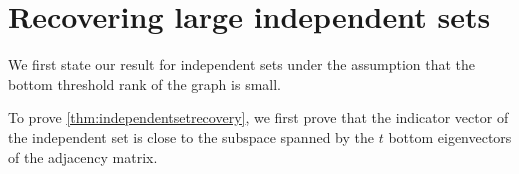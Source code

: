 \section{Recovering large independent sets}

We first state our result for independent sets under the assumption that the bottom threshold rank of the graph is small.




To prove \cref{thm:independentsetrecovery}, we first prove that the indicator vector of the independent set is close to the subspace spanned by the $t$ bottom eigenvectors of the adjacency matrix.

